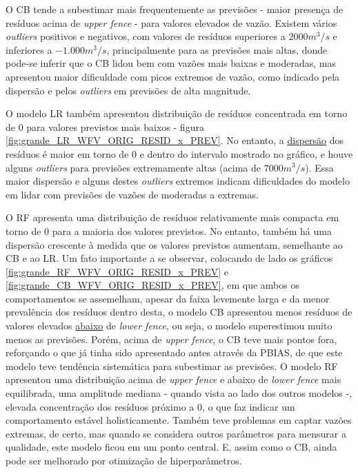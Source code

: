 O CB tende a subestimar mais frequentemente as previsões - maior presença de resíduos acima de \textit{upper fence} - para valores elevados de vazão. Existem vários \textit{outliers} positivos e negativos, com valores de resíduos superiores a $2000 m^3/s$ e inferiores a $-1.000 m^3/s$, principalmente para as previsões mais altas, donde pode-se inferir que o CB lidou bem com vazões mais baixas e moderadas, mas apresentou maior dificuldade com picos extremos de vazão, como indicado pela dispersão e pelos \textit{outliers} em previsões de alta magnitude.

O modelo LR também apresentou distribuição de resíduos concentrada em torno de $0$ para valores previstos mais baixos - figura \ref{fig:grande_LR_WFV_ORIG_RESID_x_PREV}. No entanto, a \underline{dispersão} dos resíduos é maior em torno de $0$ e dentro do intervalo mostrado no gráfico, e houve alguns \textit{outliers} para previsões extremamente altas (acima de $7000 m^3/s$). Essa maior dispersão e alguns destes \textit{outliers} extremos indicam dificuldades do modelo em lidar com previsões de vazões de moderadas a extremas.

O RF apresenta uma distribuição de resíduos relativamente mais compacta em torno de $0$ para a maioria dos valores previstos. No entanto, também há uma dispersão crescente à medida que os valores previstos aumentam, semelhante ao CB e ao LR. Um fato importante a se observar, colocando de lado os gráficos \ref{fig:grande_RF_WFV_ORIG_RESID_x_PREV} e \ref{fig:grande_CB_WFV_ORIG_RESID_x_PREV}, em que ambos os comportamentos se assemelham, apesar da faixa levemente larga e da menor prevalência dos resíduos dentro desta, o modelo CB apresentou menos resíduos de valores elevados \underline{abaixo} de \textit{lower fence}, ou seja, o modelo superestimou muito menos as previsões. Porém, acima de \textit{upper fence}, o CB teve mais pontos fora, reforçando o que já tinha sido apresentado antes através da PBIAS, de que este modelo teve tendência sistemática para subestimar as previsões. O modelo RF apresentou uma distribuição acima de \textit{upper fence} e abaixo de \textit{lower fence} mais equilibrada, uma amplitude mediana - quando vista ao lado dos outros modelos -, elevada concentração dos resíduos próximo a $0$, o que faz indicar um comportamento estável holisticamente. Também teve problemas em captar vazões extremas, de certo, mas quando se considera outros parâmetros para mensurar a qualidade, este modelo ficou em um ponto central. E, assim como o CB, ainda pode ser melhorado por otimização de hiperparâmetros.

